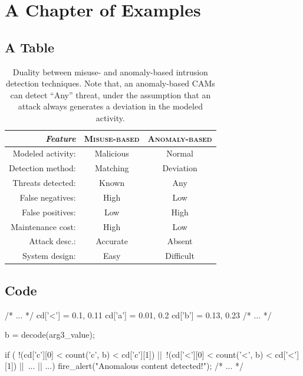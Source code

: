 \chapter{A Chapter of Examples}
\label{chapter1}

\section{A Table}

\begin{table}[h]
\centering
\begin{tabular}{rcc}
\toprule \emph{Feature} & \textsc{Misuse-based} &
\textsc{Anomaly-based}\\
    
\midrule Modeled activity: & Malicious & Normal\\
Detection method: & Matching & Deviation\\
Threats detected: & Known & Any\\
False negatives: & High & Low\\
False positives: & Low & High\\
Maintenance cost: & High & Low\\
Attack desc.: & Accurate & Absent\\
System design: & Easy & Difficult\\
\bottomrule
\end{tabular}
\caption[Duality between misuse- and anomaly-based intrusion detection techniques.]{Duality between misuse- and anomaly-based intrusion detection techniques. Note that, an anomaly-based \acp{CAM} can detect ``Any'' threat, under the assumption that an attack always generates a deviation in the modeled activity.}
\label{tab:misuse-vs-anomaly}
\end{table}


\section{Code}

\begin{pseudoc}
  /* ... */ cd['<'] = {0.1, 0.11} cd['a'] = {0.01, 0.2} cd['b'] =
  {0.13, 0.23} /* ... */

  b = decode(arg3_value);
  
  if ( !(cd['c'][0] < count('c', b) < cd['c'][1]) ||\
       !(cd['<'][0] < count('<', b) < cd['<'][1]) ||\
       ... || ...)  fire_alert("Anomalous content detected!");
  /* ... */
\end{pseudoc}


